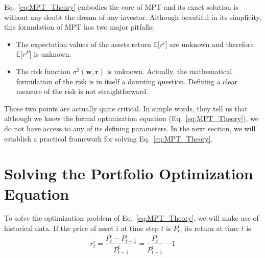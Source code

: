 \documentclass[a4paper,12pt]{report}
\begin{document}
Eq.~\ref{eq:MPT_Theory} embodies the core of MPT and its exact solution is without any doubt the dream of any investor. Although beautiful in its simplicity, this formulation of MPT has two major pitfalls:
\begin{itemize}
\item The expectation values of the assets return $\mathbb{E}\big[r^i\big]$ are unknown and therefore $\mathbb{E}\big[r^P\big]$ is unknown.
\item The risk function $\sigma^2(\mathbf{w}, \mathbf{r})$ is unknown. Actually, the mathematical formulation of the risk is in itself a daunting question. Defining a clear measure of the risk is not straightforward.
\end{itemize}

Those two points are actually quite critical. In simple words, they tell us that although we know the formal optimization equation (Eq.~\ref{eq:MPT_Theory}), we do not have access to any of its defining parameters. In the next section, we will establish a practical framework for solving Eq.~\ref{eq:MPT_Theory}.

\section{Solving the Portfolio Optimization Equation}
To solve the optimization problem of Eq.~\ref{eq:MPT_Theory}, we will make use of historical data. If the price of asset $i$ at time step $t$ is $P_t^i$, its return at time $t$ is
\begin{equation}
r_t^i = \frac{P_t^i - P_{t-1}^i}{P_{t-1}^i} = \frac{P_t^i }{P_{t-1}^i} - 1
\end{equation}
\end{document}
